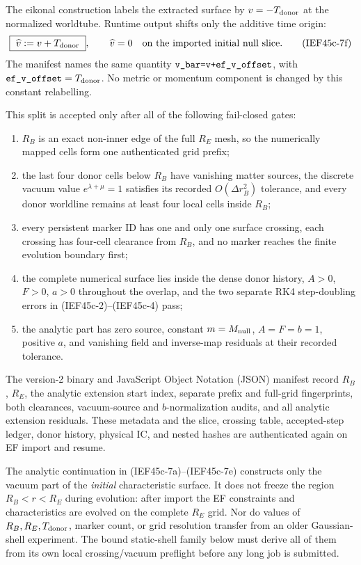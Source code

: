 The eikonal construction labels the extracted surface by \(v=-T_{\rm donor}\)
at the normalized worldtube.  Runtime output shifts only the additive time
origin:
\[
 \boxed{\ \widehat v:=v+T_{\rm donor}\ },
 \qquad \widehat v=0\quad\hbox{on the imported initial null slice}.          \tag{IEF45c-7f}
\]
The manifest names the same quantity
\(\code{v_bar=v+ef_v_offset}\), with
\(\code{ef_v_offset}=T_{\rm donor}\).  No metric or momentum component is
changed by this constant relabelling.

This split is accepted only after all of the following fail-closed gates:
\begin{enumerate}
\item \(R_B\) is an exact non-inner edge of the full \(R_E\) mesh, so the
      numerically mapped cells form one authenticated grid prefix;
\item the last four donor cells below \(R_B\) have vanishing matter sources,
      the discrete vacuum value \(e^{\lambda+\mu}=1\) satisfies its recorded
      \(O(\Delta r_B^2)\) tolerance, and every donor worldline remains at
      least four local cells inside \(R_B\);
\item every persistent marker ID has one and only one surface crossing, each
      crossing has four-cell clearance from \(R_B\), and no marker reaches
      the finite evolution boundary first;
\item the complete numerical surface lies inside the dense donor history,
      \(A>0\), \(F>0\), \(a>0\) throughout the overlap, and the two separate
      RK4 step-doubling errors in (IEF45c-2)--(IEF45c-4) pass;
\item the analytic part has zero source, constant \(m=M_{\rm null}\),
      \(A=F=b=1\), positive \(a\), and vanishing field and inverse-map
      residuals at their recorded tolerance.
\end{enumerate}
The version-2 binary and JavaScript Object Notation (JSON) manifest record
\(R_B\), \(R_E\), the analytic
extension start index, separate prefix and full-grid fingerprints, both
clearances, vacuum-source and \(b\)-normalization audits, and all analytic
extension residuals.  These metadata and the slice, crossing table,
accepted-step ledger, donor history, physical IC, and nested hashes are
authenticated again on EF import and resume.

The analytic continuation in (IEF45c-7a)--(IEF45c-7e) constructs only the
vacuum part of the \emph{initial} characteristic surface.  It does not freeze
the region \(R_B<r<R_E\) during evolution: after import the EF constraints and
characteristics are evolved on the complete \(R_E\) grid.  Nor do values of
\(R_B,R_E,T_{\rm donor}\), marker count, or grid resolution transfer from an
older Gaussian-shell experiment.  The bound static-shell family below must
derive all of them from its own local crossing/vacuum preflight before any
long job is submitted.

